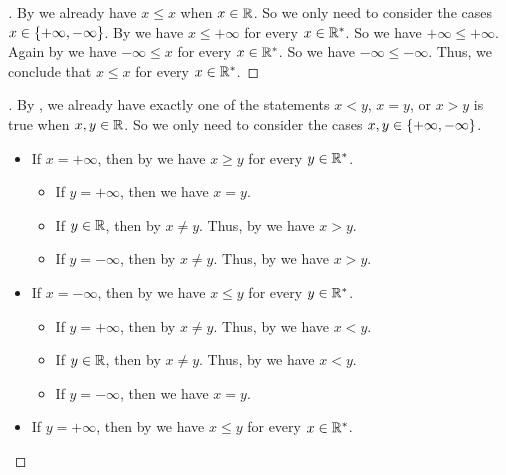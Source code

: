 \begin{proof}[]
  By  we already have \(x \leq x\) when \(x \in \mathbb{R}\).
  So we only need to consider the cases \(x \in \left\lbrace+\infty, -\infty\right\rbrace\).
  By  we have \(x \leq +\infty\) for every \(x \in \mathbb{R}^*\).
  So we have \(+\infty \leq +\infty\).
  Again by  we have \(-\infty \leq x\) for every \(x \in \mathbb{R}^*\).
  So we have \(-\infty \leq -\infty\).
  Thus, we conclude that \(x \leq x\) for every \(x \in \mathbb{R}^*\).
\end{proof}

\begin{proof}[]
  By , we already have exactly one of the statements \(x < y\), \(x = y\), or \(x > y\) is true when \(x, y \in \mathbb{R}\).
  So we only need to consider the cases \(x, y \in \left\lbrace+\infty, -\infty\right\rbrace\).
  \begin{itemize}
    \item If \(x = +\infty\), then by  we have \(x \geq y\) for every \(y \in \mathbb{R}^*\).
          \begin{itemize}
            \item If \(y = +\infty\), then we have \(x = y\).
            \item If \(y \in \mathbb{R}\), then by  \(x \neq y\).
                  Thus, by  we have \(x > y\).
            \item If \(y = -\infty\), then by  \(x \neq y\).
                  Thus, by  we have \(x > y\).
          \end{itemize}
    \item If \(x = -\infty\), then by  we have \(x \leq y\) for every \(y \in \mathbb{R}^*\).
          \begin{itemize}
            \item If \(y = +\infty\), then by  \(x \neq y\).
                  Thus, by  we have \(x < y\).
            \item If \(y \in \mathbb{R}\), then by  \(x \neq y\).
                  Thus, by  we have \(x < y\).
            \item If \(y = -\infty\), then we have \(x = y\).
          \end{itemize}
    \item If \(y = +\infty\), then by  we have \(x \leq y\) for every \(x \in \mathbb{R}^*\).

\end{itemize}
\end{proof}
